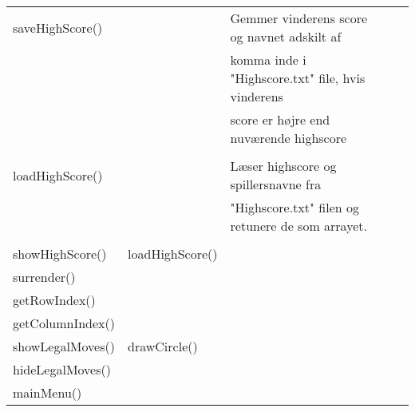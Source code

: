 \begin{table}[H]
\begin{tabular}{lllll}
        saveHighScore()  &                 & Gemmer vinderens score og navnet adskilt af                        \\
                         &                 & komma inde i "Highscore.txt" file, hvis vinderens                  \\
                         &                 & score er højre end nuværende highscore                             \\
        \\
        loadHighScore()  &                 & Læser highscore og spillersnavne fra                               \\
                         &                 & "Highscore.txt" filen og retunere de som arrayet.                  \\
        \\
        showHighScore()  & loadHighScore()                                                                      \\
        surrender()                                                                                             \\
        getRowIndex()                                                                                           \\
        getColumnIndex()                                                                                        \\
        showLegalMoves() & drawCircle()                                                                         \\
        hideLegalMoves()                                                                                        \\
        mainMenu()                                                                                              \\

        \bottomrule
    \end{tabular}
\end{table}
